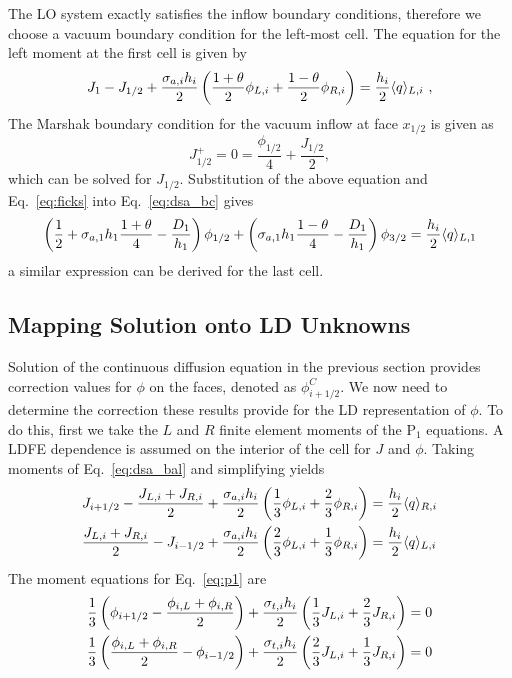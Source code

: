The LO system exactly satisfies the inflow boundary conditions, therefore we choose a
vacuum boundary condition for the left-most cell.  The equation for the left moment
at the first cell is given by
\begin{equation}\label{eq:dsa_bc}
    J_{1} - J_{1/2}  + \frac{\sigma_{a,i}h_i}{2} \left(\frac{1+\theta}{2} \phi_{L,i}
    + \frac{1-\theta}{2}
    \phi_{R,i} \right) = \frac{h_i}{2} \langle q \rangle_{L,i}\,\,,
\end{equation}
The Marshak boundary condition for the vacuum inflow at face $x_{1/2}$ is given as
\begin{equation}
    J^+_{1/2} = 0 = \frac{\phi_{1/2}}{4} + \frac{J_{1/2}}{2},
\end{equation}
which can be solved for $J_{1/2}$.  Substitution of the above equation and
Eq.~\eqref{eq:ficks} into Eq.~\eqref{eq:dsa_bc} gives 
\begin{equation}
    \left(\frac{1}{2}+ \sigma_{a,1}h_1\frac{1+\theta}{4} - \frac{D_1}{h_1}\right)\phi_{1/2} +
    \left( {\sigma_{a,1}{h_1}}\frac{1-\theta}{4} - \frac{D_1}{h_1}  \right)\phi_{3/2} =
    \frac{h_i}{2} \langle q \rangle_{L,1}
\end{equation}
a similar expression can be derived for the last cell.


\subsection{Mapping Solution onto LD Unknowns}

Solution of the continuous diffusion equation in the previous section provides
correction values for $\phi$ on the faces, denoted as $\phi_{i+1/2}^C$. We now need
to determine the correction these results provide for the LD representation of
$\phi$. To do this, first we take the $L$ and $R$ finite element moments of the P$_1$
equations.  A LDFE dependence is assumed on the interior of the cell for $J$ and
$\phi$.  Taking moments of Eq.~\eqref{eq:dsa_bal} and simplifying yields
\begin{align}
    J_{{i+1/2}} - \frac{J_{L,i} + J_{R,i}}{2} + \frac{\sigma_{a,i} h_i}{2} \left(\frac{1}{3} \phi_{L,i} +
    \frac{2}{3}\phi_{R,i}\right) &= \frac{h_i}{2} \langle q \rangle_{R,i} \\
    \frac{J_{L,i} + J_{R,i}}{2} - J_{i-1/2} + \frac{\sigma_{a,i} h_i}{2}
    \left(\frac{2}{3} \phi_{L,i} +
    \frac{1}{3}\phi_{R,i}\right) &= \frac{h_i}{2} \langle q \rangle_{L,i}
\end{align}
The moment equations for Eq.~\eqref{eq:p1} are
\begin{align}
    \frac{1}{3}\left(\phi_{{i+1/2}} - \frac{\phi_{i,L} + \phi_{i,R}}{2}\right) +
    \frac{\sigma_{t,i} h_i}{2} \left(\frac{1}{3} J_{L,i} + \frac{2}{3}J_{R,i}\right)
    &= 0 \\
    \frac{1}{3}\left(\frac{\phi_{i,L} + \phi_{i,R}}{2} - \phi_{i-1/2} \right) +
    \frac{\sigma_{t,i} h_i}{2} \left(\frac{2}{3} J_{L,i} + \frac{1}{3}J_{R,i}\right)
    &= 0 
\end{align}

